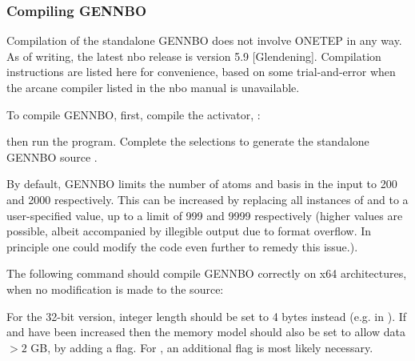 \documentclass[letterpaper,10pt,english]{sphinxmanual}
\begin{document}
\subsubsection{Compiling GENNBO}
\label{\detokenize{nbo_onetep:compiling-gennbo}}
Compilation of the standalone GENNBO does not involve ONETEP in any way.
As of writing, the latest nbo release is version
5.9 {[}Glendening{]}. Compilation instructions are listed here
for convenience, based on some trial-and-error when the arcane 
compiler listed in the nbo manual is unavailable.

To compile GENNBO, first, compile the activator, :
\begin{quote}

\end{quote}

then run the  program. Complete the selections to generate the
standalone GENNBO source .

By default, GENNBO limits the number of atoms and basis in the
 input to 200 and 2000 respectively. This can be increased by
replacing all instances of  and  to a
user-specified value, up to a limit of 999 and 9999 respectively (higher
values are possible, albeit accompanied by illegible output due to
format overflow. In principle one could modify the code even further to
remedy this issue.).

The following command should compile GENNBO correctly on x64
architectures, when no modification is made to the  source:
\begin{quote}

\begin{DUlineblock}{0em}
\item[] 
\item[] 
\end{DUlineblock}
\end{quote}

For the 32-bit version, integer length should be set to 4 bytes instead
(e.g.  in ). If  and  have been
increased then the memory model should also be set to allow data
\(> 2\) GB, by adding a  flag. For , an
additional  flag is most likely necessary.
\end{document}
